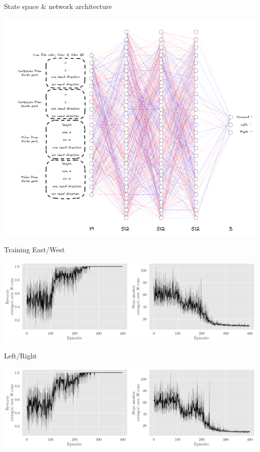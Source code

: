 \documentclass[bigger]{beamer}
\begin{document}
\begin{frame}[label={sec:org09b5a7b}]{State space \& network architecture}
\begin{center}
\includegraphics[height=0.95\textheight]{img/state-space-nn.png}
\end{center}
\end{frame}
\begin{frame}[label={sec:org94113bf}]{Training}
East/West
\begin{center}
\includegraphics[height=0.35\textheight]{img/steps-and-rewards-EastWest.png}
\end{center}
Left/Right
\begin{center}
\includegraphics[height=0.35\textheight]{img/steps-and-rewards-LeftRight.png}
\end{center}
\end{frame}
\end{document}
